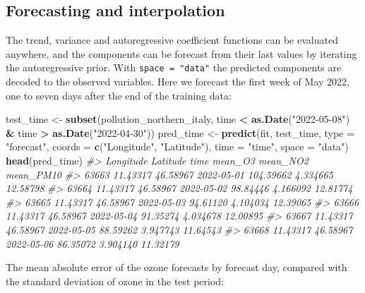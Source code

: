 \documentclass[
]{article}
\newenvironment{Shaded}{\begin{snugshade}}{\end{snugshade}}
\newcommand{\AttributeTok}[1]{\textcolor[rgb]{0.13,0.29,0.53}{#1}}
\newcommand{\CommentTok}[1]{\textcolor[rgb]{0.56,0.35,0.01}{\textit{#1}}}
\newcommand{\FunctionTok}[1]{\textcolor[rgb]{0.13,0.29,0.53}{\textbf{#1}}}
\newcommand{\NormalTok}[1]{#1}
\newcommand{\OtherTok}[1]{\textcolor[rgb]{0.56,0.35,0.01}{#1}}
\newcommand{\SpecialCharTok}[1]{\textcolor[rgb]{0.81,0.36,0.00}{\textbf{#1}}}
\newcommand{\StringTok}[1]{\textcolor[rgb]{0.31,0.60,0.02}{#1}}
\begin{document}
\subsection{Forecasting and
interpolation}\label{forecasting-and-interpolation}

The trend, variance and autoregressive coefficient functions can be
evaluated anywhere, and the components can be forecast from their last
values by iterating the autoregressive prior. With
\texttt{space\ =\ "data"} the predicted components are decoded to the
observed variables. Here we forecast the first week of May 2022, one to
seven days after the end of the training data:

\begin{Shaded}
\begin{Highlighting}[]
\NormalTok{test\_time }\OtherTok{\textless{}{-}} \FunctionTok{subset}\NormalTok{(pollution\_northern\_italy, }
\NormalTok{                     time }\SpecialCharTok{\textless{}} \FunctionTok{as.Date}\NormalTok{(}\StringTok{"2022{-}05{-}08"}\NormalTok{) }\SpecialCharTok{\&}\NormalTok{ time }\SpecialCharTok{\textgreater{}} \FunctionTok{as.Date}\NormalTok{(}\StringTok{"2022{-}04{-}30"}\NormalTok{))}
\NormalTok{pred\_time }\OtherTok{\textless{}{-}} \FunctionTok{predict}\NormalTok{(fit, test\_time, }\AttributeTok{type =} \StringTok{"forecast"}\NormalTok{,}
              \AttributeTok{coords =} \FunctionTok{c}\NormalTok{(}\StringTok{"Longitude"}\NormalTok{, }\StringTok{"Latitude"}\NormalTok{), }\AttributeTok{time =} \StringTok{"time"}\NormalTok{,}
              \AttributeTok{space =} \StringTok{"data"}\NormalTok{)}
\FunctionTok{head}\NormalTok{(pred\_time)}
\CommentTok{\#\textgreater{}       Longitude Latitude       time   mean\_O3 mean\_NO2 mean\_PM10}
\CommentTok{\#\textgreater{} 63663  11.43317 46.58967 2022{-}05{-}01 104.59662 4.334665  12.58798}
\CommentTok{\#\textgreater{} 63664  11.43317 46.58967 2022{-}05{-}02  98.84446 4.166092  12.81774}
\CommentTok{\#\textgreater{} 63665  11.43317 46.58967 2022{-}05{-}03  94.61120 4.104034  12.39065}
\CommentTok{\#\textgreater{} 63666  11.43317 46.58967 2022{-}05{-}04  91.35274 4.034678  12.00895}
\CommentTok{\#\textgreater{} 63667  11.43317 46.58967 2022{-}05{-}05  88.59262 3.947743  11.64543}
\CommentTok{\#\textgreater{} 63668  11.43317 46.58967 2022{-}05{-}06  86.35072 3.904140  11.32179}
\end{Highlighting}
\end{Shaded}

The mean absolute error of the ozone forecasts by forecast day, compared
with the standard deviation of ozone in the test period:
\end{document}
